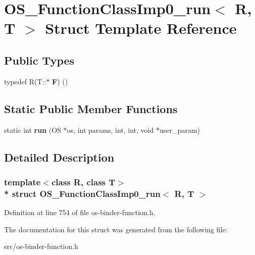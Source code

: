 \hypertarget{struct_o_s___function_class_imp0__run}{}\section{O\+S\+\_\+\+Function\+Class\+Imp0\+\_\+run$<$ R, T $>$ Struct Template Reference}
\label{struct_o_s___function_class_imp0__run}
\subsection*{Public Types}
\begin{DoxyCompactItemize}
\item 
typedef R(T\+::$\ast$ {\bfseries F}) ()\hypertarget{struct_o_s___function_class_imp0__run_aacc7d06b3c094fbae0bb6b92d4ffa84f}{}\label{struct_o_s___function_class_imp0__run_aacc7d06b3c094fbae0bb6b92d4ffa84f}

\end{DoxyCompactItemize}
\subsection*{Static Public Member Functions}
\begin{DoxyCompactItemize}
\item 
static int {\bfseries run} (OS $\ast$os, int params, int, int, void $\ast$user\+\_\+param)\hypertarget{struct_o_s___function_class_imp0__run_a6aac616ccef4d29dc8251cb747b8a796}{}\label{struct_o_s___function_class_imp0__run_a6aac616ccef4d29dc8251cb747b8a796}

\end{DoxyCompactItemize}


\subsection{Detailed Description}
\subsubsection*{template$<$class R, class T$>$\\*
struct O\+S\+\_\+\+Function\+Class\+Imp0\+\_\+run$<$ R, T $>$}



Definition at line 754 of file os-\/binder-\/function.\+h.



The documentation for this struct was generated from the following file\+:\begin{DoxyCompactItemize}
\item 
src/os-\/binder-\/function.\+h\end{DoxyCompactItemize}
